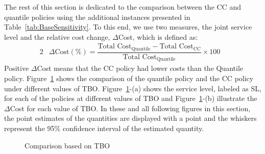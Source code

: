 \documentclass[msom]{oo}
\begin{document}
The rest of this section is dedicated to the comparison between the CC and quantile policies using the additional instances presented in Table~\ref{tab:BaseSensitivity}. To this end, we use two measures, the joint service level and the relative cost change, $\Delta$Cost, which is defined as: 
\begin{alignat}{2}
  & \Delta \text{Cost} (\%) = \dfrac{\text{Total Cost}_{\text{Quantile}} - \text{Total Cost} _{\text{CC}}}{\text{Total Cost}_\text{{Quantile}}} \times 100& \label{eq:ِDeltaCost} 
 \end{alignat}
Positive $\Delta$Cost means that the CC policy had lower costs than the Quantile policy.
Figure~\ref{fig:TBOComp} shows the comparison of the quantile policy and the CC policy under different values of TBO. Figure~\ref{fig:TBOComp}-(a) shows the service level, labeled as SL, for each of the policies at different values of TBO and Figure~\ref{fig:TBOComp}-(b) illustrate the $\Delta$Cost for each value of TBO. In these and all following figures in this section, the point estimates of the quantities are displayed with a point and the whiskers represent the 95\% confidence interval of the estimated quantity.
\begin{figure}[b]
    \centering
    \caption{Comparison based on TBO}%
    \label{fig:TBOComp}%
\end{figure}
\end{document}
